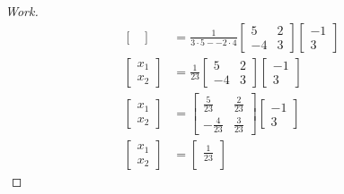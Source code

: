\documentclass{article}
\begin{document}
\begin{enumerate}
{\begin{proof}[Work]
\begin{align*}
\begin{bmatrix}
                \end{bmatrix} & = \frac{1}{3 \cdot 5 - -2 \cdot 4}
                \begin{bmatrix}
                    5  & 2 \\
                    -4 & 3
                \end{bmatrix}
                \begin{bmatrix}
                    -1 \\
                    3
                \end{bmatrix}                                     \\
                \begin{bmatrix}
                    x_1 \\
                    x_2
                \end{bmatrix} & = \frac{1}{23}
                \begin{bmatrix}
                    5  & 2 \\
                    -4 & 3
                \end{bmatrix}
                \begin{bmatrix}
                    -1 \\
                    3
                \end{bmatrix}                                     \\
                \begin{bmatrix}
                    x_1 \\
                    x_2
                \end{bmatrix} & =
                \begin{bmatrix}
                    \frac{5}{23}  & \frac{2}{23} \\
                    -\frac{4}{23} & \frac{3}{23}
                \end{bmatrix}
                \begin{bmatrix}
                    -1 \\
                    3
                \end{bmatrix}                                     \\
                \begin{bmatrix}
                    x_1 \\
                    x_2
                \end{bmatrix} & =
                \begin{bmatrix}
                    \frac{1}{23} \\

\end{bmatrix}
\end{align*}
\end{proof}}
\end{enumerate}
\end{document}
